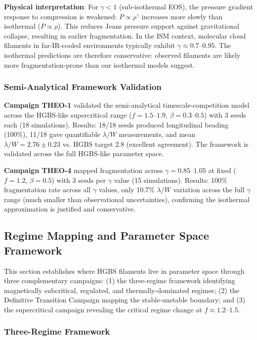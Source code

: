 \documentclass[twocolumn,usenatbib]{mnras}
\begin{document}
\textbf{Physical interpretation}: For $\gamma < 1$ (sub-isothermal EOS), the pressure gradient response to compression is weakened: $P \propto \rho^{\gamma}$ increases more slowly than isothermal ($P \propto \rho$). This reduces Jeans pressure support against gravitational collapse, resulting in earlier fragmentation. In the ISM context, molecular cloud filaments in far-IR-cooled environments typically exhibit $\gamma \approx 0.7$--$0.95$. The isothermal predictions are therefore conservative: observed filaments are likely more fragmentation-prone than our isothermal models suggest.

\subsubsection{Semi-Analytical Framework Validation}

\textbf{Campaign THEO-1} validated the semi-analytical timescale-competition model across the HGBS-like supercritical range ($f = 1.5$--$1.9$, $\beta = 0.3$--$0.5$) with 3 seeds each (18 simulations). Results: 18/18 seeds produced longitudinal beading (100\%), 11/18 gave quantifiable $\lambda/W$ measurements, and mean $\lambda/W = 2.76 \pm 0.23$ vs. HGBS target 2.8 (excellent agreement). The framework is validated across the full HGBS-like parameter space.

\textbf{Campaign THEO-4} mapped fragmentation across $\gamma = 0.85$--$1.05$ at fixed ($f = 1.2$, $\beta = 0.5$) with 3 seeds per $\gamma$ value (15 simulations). Results: 100\% fragmentation rate across all $\gamma$ values, only 10.7\% $\lambda/W$ variation across the full $\gamma$ range (much smaller than observational uncertainties), confirming the isothermal approximation is justified and conservative.

\subsection{Regime Mapping and Parameter Space Framework}

This section establishes where HGBS filaments live in parameter space through three complementary campaigns: (1) the three-regime framework identifying magnetically subcritical, regulated, and thermally-dominated regimes; (2) the Definitive Transition Campaign mapping the stable-unstable boundary; and (3) the supercritical campaign revealing the critical regime change at $f \approx 1.2$--$1.5$.

\subsubsection{Three-Regime Framework}
\end{document}
